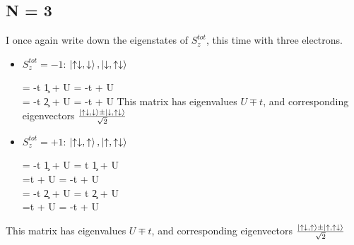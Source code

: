 \documentclass[12pt]{article}
\begin{document}
\subsection{N = 3}
I once again write down the eigenstates of \(S_z^{tot}\), this time with three electrons.
\begin{itemize}
\item \(S_z^{tot} = -1\): \(\ket{\uparrow\downarrow,\downarrow}, \ket{\downarrow,\uparrow\downarrow}\)

\beq
\ham \ket{\uparrow\downarrow,\downarrow} = -t \c{1}{\uparrow}\ket{\uparrow\downarrow,\downarrow} + U\ket{\uparrow\downarrow,\downarrow} = -t\ket{\downarrow,\uparrow\downarrow} + U\ket{\uparrow\downarrow,\downarrow} \\
\ham \ket{\downarrow,\uparrow\downarrow} = -t \c{2}{\uparrow}\ket{\downarrow,\uparrow\downarrow} + U\ket{\downarrow,\uparrow\downarrow} = -t\ket{\uparrow\downarrow,\downarrow} + U\ket{\downarrow,\uparrow\downarrow}
\eeq
\beq
{}
\eeq
This matrix has eigenvalues \(U \mp t\), and corresponding eigenvectors \(\frac{\ket{\uparrow\downarrow,\downarrow} \pm \ket{\downarrow,\uparrow\downarrow}}{\sqrt{2}}\)

\item \(S_z^{tot} = +1\): \(\ket{\uparrow\downarrow,\uparrow}, \ket{\uparrow,\uparrow\downarrow}\)

\beq
\ham \ket{\uparrow\downarrow,\uparrow} = -t \c{1}{\downarrow}\ket{\uparrow\downarrow,\uparrow} + U\ket{\uparrow\downarrow,\uparrow} = t \c{1}{\downarrow}\ket{\downarrow\uparrow,\uparrow} + U\ket{\uparrow\downarrow,\uparrow} \\
=t \ket{\uparrow,\downarrow\uparrow} + U\ket{\uparrow\downarrow,\uparrow} = -t \ket{\uparrow,\uparrow\downarrow} + U\ket{\uparrow\downarrow,\uparrow}\\
\ham \ket{\uparrow,\uparrow\downarrow} = -t \c{2}{\downarrow}\ket{\uparrow,\uparrow\downarrow} + U\ket{\uparrow,\uparrow\downarrow} = t \c{2}{\downarrow}\ket{\uparrow,\downarrow\uparrow} + U\ket{\uparrow,\uparrow\downarrow} \\
=t \ket{\downarrow\uparrow,\uparrow} + U\ket{\uparrow,\uparrow\downarrow} = -t \ket{\uparrow\downarrow,\uparrow} + U\ket{\uparrow,\uparrow\downarrow}\\
\eeq

\beq
{}
\eeq
\end{itemize}
This matrix has eigenvalues \(U \mp t\), and corresponding eigenvectors \(\frac{\ket{\uparrow\downarrow,\uparrow} \pm \ket{\uparrow,\uparrow\downarrow}}{\sqrt{2}}\)
\end{document}

